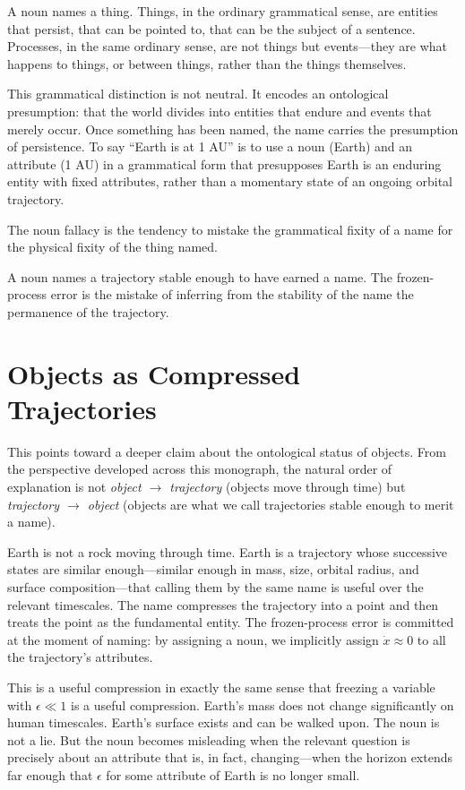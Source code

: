 \documentclass[11pt]{book}
\theoremstyle{plain}
\theoremstyle{definition}
\theoremstyle{remark}
\begin{document}
A noun names a thing. Things, in the ordinary grammatical sense, are entities that persist, that can be pointed to, that can be the subject of a sentence. Processes, in the same ordinary sense, are not things but events---they are what happens to things, or between things, rather than the things themselves.

This grammatical distinction is not neutral. It encodes an ontological presumption: that the world divides into entities that endure and events that merely occur. Once something has been named, the name carries the presumption of persistence. To say ``Earth is at 1 AU'' is to use a noun (Earth) and an attribute (1 AU) in a grammatical form that presupposes Earth is an enduring entity with fixed attributes, rather than a momentary state of an ongoing orbital trajectory.

The noun fallacy is the tendency to mistake the grammatical fixity of a name for the physical fixity of the thing named.

\begin{tcolorbox}[title={The Noun Fallacy}]
A noun names a trajectory stable enough to have earned a name. The frozen-process error is the mistake of inferring from the stability of the name the permanence of the trajectory.
\end{tcolorbox}

\section{Objects as Compressed Trajectories}

This points toward a deeper claim about the ontological status of objects. From the perspective developed across this monograph, the natural order of explanation is not \emph{object $\to$ trajectory} (objects move through time) but \emph{trajectory $\to$ object} (objects are what we call trajectories stable enough to merit a name).

Earth is not a rock moving through time. Earth is a trajectory whose successive states are similar enough---similar enough in mass, size, orbital radius, and surface composition---that calling them by the same name is useful over the relevant timescales. The name compresses the trajectory into a point and then treats the point as the fundamental entity. The frozen-process error is committed at the moment of naming: by assigning a noun, we implicitly assign $\dot x \approx 0$ to all the trajectory's attributes.

This is a useful compression in exactly the same sense that freezing a variable with $\epsilon \ll 1$ is a useful compression. Earth's mass does not change significantly on human timescales. Earth's surface exists and can be walked upon. The noun is not a lie. But the noun becomes misleading when the relevant question is precisely about an attribute that is, in fact, changing---when the horizon extends far enough that $\epsilon$ for some attribute of Earth is no longer small.
\end{document}
